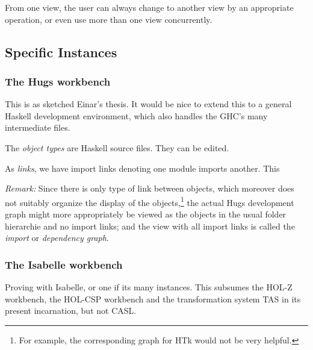 \documentclass[a4paper]{article}
\begin{document}
From one view, the user can always change to another view by an
appropriate operation, or even use more than one view concurrently.

\subsection{Specific Instances}

\subsubsection{The Hugs workbench}

This is as sketched Einar's thesis. It would be nice to extend this to
a general Haskell development environment, which also handles the
GHC's many intermediate files.

The \emph{object types} are Haskell source files. They can be edited. 

As \emph{links}, we have import links denoting one module imports
another. This 

\emph{Remark:} Since there is only type of link between objects, which
moreover does not suitably organize the display of the
objects,\footnote{For example, the corresponding graph for HTk would
  not be very helpful.} the actual Hugs development graph might
more appropriately be viewed as the objects in the usual folder
hierarchie and no import links; and the view with all import links is
called the \emph{import} or \emph{dependency graph}.

\subsubsection{The Isabelle workbench}

Proving with Isabelle, or one if its many instances. This subsumes the
HOL-Z workbench, the HOL-CSP workbench and the transformation system
TAS in its present incarnation, but not CASL.
\end{document}
